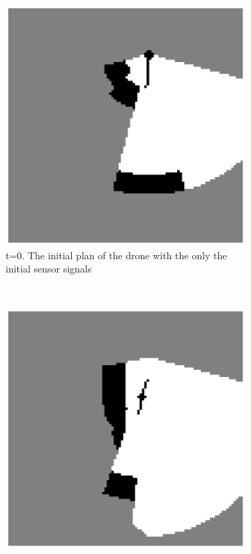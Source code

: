 \begin{figure}
\begin{subfigure}[t]{0.3\textwidth}
\includegraphics[width=\textwidth]{Figures/Simulation/initial.eps}
\caption{t=0. The initial plan of the drone with the only the initial sensor signals}
\label{fig:sim_t0}
\end{subfigure}
\,
\begin{subfigure}[t]{0.3\textwidth}
\includegraphics[width=\textwidth]{Figures/Simulation/t19.eps}

\end{subfigure}
\end{figure}

